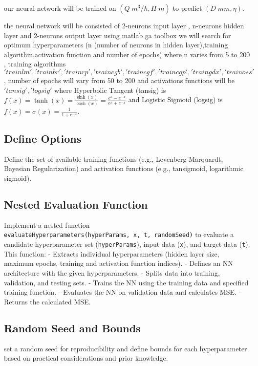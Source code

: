 \documentclass[
  super,
  review,
  3p]{elsarticle}
\begin{document}
our neural network will be trained on \((Q \; m^3/h,H \; m)\) to predict
\((D \; mm,\eta)\).

the neural network will be consisted of 2-neurons input layer ,
n-neurons hidden layer and 2-neurons output layer using matlab ga
toolbox we will search for optimum hyperparameters (n (number of neurons
in hidden layer),training algorithm,activation function and number of
epochs) where n varies from 5 to 200 , training algorithms
\({'trainlm', 'trainbr', 'trainrp', 'traincgb', 'traincgf', 'traincgp', 'traingdx', 'trainoss'}\)
, number of epochs will vary from 50 to 200 and activations functions
will be \({'tansig', 'logsig'}\) where Hyperbolic Tangent (tansig) is
\(f(x) = \tanh(x) = \frac{\sinh(x)}{\cosh(x)} = \frac{e^x - e^{-x}}{e^x + e^{-x}}\)
and Logistic Sigmoid (logsig) is
\(f(x) = \sigma(x) = \frac{1}{1 + e^{-x}}\).

\subsection{Define Options}\label{define-options}

Define the set of available training functions (e.g.,
Levenberg-Marquardt, Bayesian Regularization) and activation functions
(e.g., tansigmoid, logarithmic sigmoid).

\subsection{Nested Evaluation
Function}\label{nested-evaluation-function}

Implement a nested function
\texttt{evaluateHyperparameters(hyperParams,\ x,\ t,\ randomSeed)} to
evaluate a candidate hyperparameter set (\texttt{hyperParams}), input
data (\texttt{x}), and target data (\texttt{t}). This function: -
Extracts individual hyperparameters (hidden layer size, maximum epochs,
training and activation function indices). - Defines an NN architecture
with the given hyperparameters. - Splits data into training, validation,
and testing sets. - Trains the NN using the training data and specified
training function. - Evaluates the NN on validation data and calculates
MSE. - Returns the calculated MSE.

\subsection{Random Seed and Bounds}\label{random-seed-and-bounds}

set a random seed for reproducibility and define bounds for each
hyperparameter based on practical considerations and prior knowledge.
\end{document}
